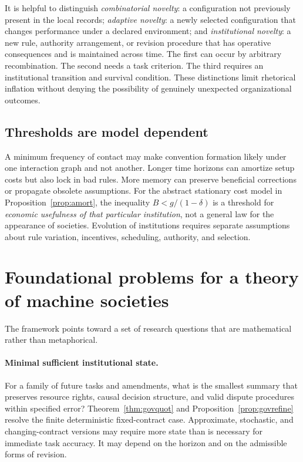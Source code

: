 \documentclass[11pt,letterpaper]{article}
\theoremstyle{plain}
\theoremstyle{definition}
\theoremstyle{remark}
\begin{document}
It is helpful to distinguish \emph{combinatorial novelty}: a configuration not previously present in the local records; \emph{adaptive novelty}: a newly selected configuration that changes performance under a declared environment; and \emph{institutional novelty}: a new rule, authority arrangement, or revision procedure that has operative consequences and is maintained across time. The first can occur by arbitrary recombination. The second needs a task criterion. The third requires an institutional transition and survival condition. These distinctions limit rhetorical inflation without denying the possibility of genuinely unexpected organizational outcomes.

\subsection{Thresholds are model dependent}

A minimum frequency of contact may make convention formation likely under one interaction graph and not another. Longer time horizons can amortize setup costs but also lock in bad rules. More memory can preserve beneficial corrections or propagate obsolete assumptions. For the abstract stationary cost model in Proposition~\ref{prop:amort}, the inequality $B<g/(1-\delta)$ is a threshold for \emph{economic usefulness of that particular institution}, not a general law for the appearance of societies. Evolution of institutions requires separate assumptions about rule variation, incentives, scheduling, authority, and selection.

\section{Foundational problems for a theory of machine societies}\label{sec:problems}

The framework points toward a set of research questions that are mathematical rather than metaphorical.

\paragraph{Minimal sufficient institutional state.}
For a family of future tasks and amendments, what is the smallest summary that preserves resource rights, causal decision structure, and valid dispute procedures within specified error? Theorem~\ref{thm:govquot} and Proposition~\ref{prop:govrefine} resolve the finite deterministic fixed-contract case. Approximate, stochastic, and changing-contract versions may require more state than is necessary for immediate task accuracy. It may depend on the horizon and on the admissible forms of revision.
\end{document}
